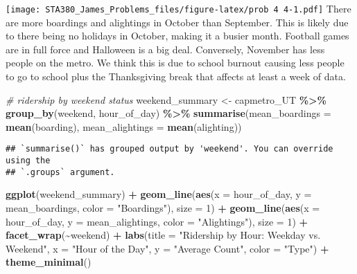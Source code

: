 \documentclass[
]{article}
\newenvironment{Shaded}{\begin{snugshade}}{\end{snugshade}}
\newcommand{\AttributeTok}[1]{\textcolor[rgb]{0.13,0.29,0.53}{#1}}
\newcommand{\CommentTok}[1]{\textcolor[rgb]{0.56,0.35,0.01}{\textit{#1}}}
\newcommand{\DecValTok}[1]{\textcolor[rgb]{0.00,0.00,0.81}{#1}}
\newcommand{\FunctionTok}[1]{\textcolor[rgb]{0.13,0.29,0.53}{\textbf{#1}}}
\newcommand{\NormalTok}[1]{#1}
\newcommand{\OtherTok}[1]{\textcolor[rgb]{0.56,0.35,0.01}{#1}}
\newcommand{\SpecialCharTok}[1]{\textcolor[rgb]{0.81,0.36,0.00}{\textbf{#1}}}
\newcommand{\StringTok}[1]{\textcolor[rgb]{0.31,0.60,0.02}{#1}}
\begin{document}
\texttt{[image: STA380\_James\_Problems\_files/figure-latex/prob 4 4-1.pdf]}
There are more boardings and alightings in October than September. This
is likely due to there being no holidays in October, making it a busier
month. Football games are in full force and Halloween is a big deal.
Conversely, November has less people on the metro. We think this is due
to school burnout causing less people to go to school plus the
Thanksgiving break that affects at least a week of data.

\begin{Shaded}
\begin{Highlighting}[]
\CommentTok{\# ridership by weekend status}
\NormalTok{weekend\_summary }\OtherTok{\textless{}{-}}\NormalTok{ capmetro\_UT }\SpecialCharTok{\%\textgreater{}\%}
  \FunctionTok{group\_by}\NormalTok{(weekend, hour\_of\_day) }\SpecialCharTok{\%\textgreater{}\%}
  \FunctionTok{summarise}\NormalTok{(}\AttributeTok{mean\_boardings =} \FunctionTok{mean}\NormalTok{(boarding), }\AttributeTok{mean\_alightings =} \FunctionTok{mean}\NormalTok{(alighting))}
\end{Highlighting}
\end{Shaded}

\begin{verbatim}
## `summarise()` has grouped output by 'weekend'. You can override using the
## `.groups` argument.
\end{verbatim}

\begin{Shaded}
\begin{Highlighting}[]
\FunctionTok{ggplot}\NormalTok{(weekend\_summary) }\SpecialCharTok{+} 
  \FunctionTok{geom\_line}\NormalTok{(}\FunctionTok{aes}\NormalTok{(}\AttributeTok{x =}\NormalTok{ hour\_of\_day, }\AttributeTok{y =}\NormalTok{ mean\_boardings, }\AttributeTok{color =} \StringTok{"Boardings"}\NormalTok{), }\AttributeTok{size =} \DecValTok{1}\NormalTok{) }\SpecialCharTok{+}
  \FunctionTok{geom\_line}\NormalTok{(}\FunctionTok{aes}\NormalTok{(}\AttributeTok{x =}\NormalTok{ hour\_of\_day, }\AttributeTok{y =}\NormalTok{ mean\_alightings, }\AttributeTok{color =} \StringTok{"Alightings"}\NormalTok{), }\AttributeTok{size =} \DecValTok{1}\NormalTok{) }\SpecialCharTok{+}
  \FunctionTok{facet\_wrap}\NormalTok{(}\SpecialCharTok{\textasciitilde{}}\NormalTok{weekend) }\SpecialCharTok{+}
  \FunctionTok{labs}\NormalTok{(}\AttributeTok{title =} \StringTok{"Ridership by Hour: Weekday vs. Weekend"}\NormalTok{,}
       \AttributeTok{x =} \StringTok{"Hour of the Day"}\NormalTok{,}
       \AttributeTok{y =} \StringTok{"Average Count"}\NormalTok{,}
       \AttributeTok{color =} \StringTok{"Type"}\NormalTok{) }\SpecialCharTok{+}
  \FunctionTok{theme\_minimal}\NormalTok{()}
\end{Highlighting}
\end{Shaded}
\end{document}
